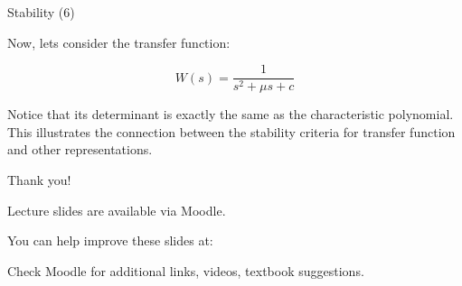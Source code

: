 \documentclass{beamer}
\begin{document}
\begin{frame}{Stability (6)}
\begin{flushleft}

Now, lets consider the transfer function:

\begin{equation}
    W(s) = \frac{1}{s^2 + \mu s + c }
\end{equation}

Notice that its determinant is exactly the same as the characteristic polynomial. This illustrates the connection between the stability criteria for transfer function and other representations.


\end{flushleft}
\end{frame}













\begin{frame}{Thank you!}
\centerline{Lecture slides are available via Moodle.}
\bigskip
\centerline{You can help improve these slides at:}
\centerline{\mygit}
\bigskip
\centerline{Check Moodle for additional links, videos, textbook suggestions.}
\bigskip

\centerline{\textcolor{black}{}}
\end{frame}
\end{document}
